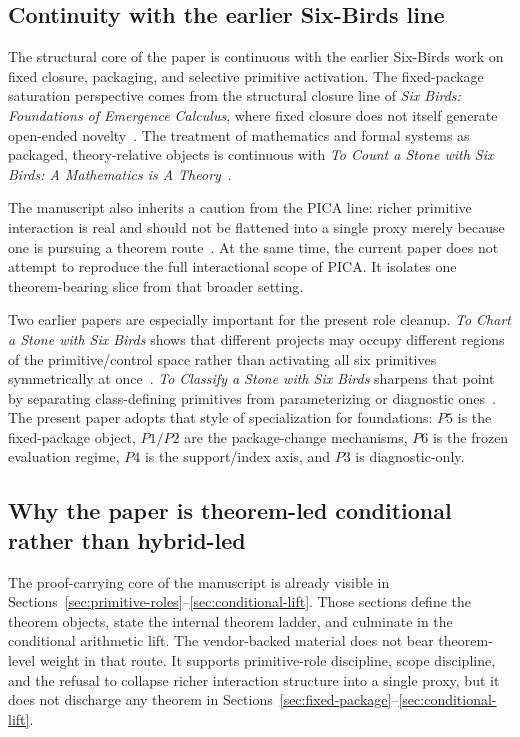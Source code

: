 \documentclass[11pt]{article}
\begin{document}
\subsection*{Continuity with the earlier Six-Birds line}

The structural core of the paper is continuous with the earlier Six-Birds work
on fixed closure, packaging, and selective primitive activation. The
fixed-package saturation perspective comes from the structural closure line of
\emph{Six Birds: Foundations of Emergence Calculus}, where fixed closure does not
itself generate open-ended novelty~\cite{Tsiokos2026Foundations}. The treatment
of mathematics and formal systems as packaged, theory-relative objects is
continuous with \emph{To Count a Stone with Six Birds: A Mathematics is A
Theory}~\cite{Tsiokos2026ToCount}.

The manuscript also inherits a caution from the PICA line: richer primitive
interaction is real and should not be flattened into a single proxy merely
because one is pursuing a theorem route~\cite{Tsiokos2026ToCreate}. At the same
time, the current paper does not attempt to reproduce the full interactional
scope of PICA. It isolates one theorem-bearing slice from that broader setting.

Two earlier papers are especially important for the present role cleanup.
\emph{To Chart a Stone with Six Birds} shows that different projects may occupy
different regions of the primitive/control space rather than activating all six
primitives symmetrically at once~\cite{Tsiokos2026ToChart}. \emph{To Classify a
Stone with Six Birds} sharpens that point by separating class-defining
primitives from parameterizing or diagnostic ones~\cite{Tsiokos2026ToClassify}.
The present paper adopts that style of specialization for foundations: \(P5\) is
the fixed-package object, \(P1/P2\) are the package-change mechanisms, \(P6\) is
the frozen evaluation regime, \(P4\) is the support/index axis, and \(P3\) is
diagnostic-only.

\subsection*{Why the paper is theorem-led conditional rather than hybrid-led}

The proof-carrying core of the manuscript is already visible in
Sections~\ref{sec:primitive-roles}--\ref{sec:conditional-lift}. Those sections
define the theorem objects, state the internal theorem ladder, and culminate in
the conditional arithmetic lift. The vendor-backed material does not bear
theorem-level weight in that route. It supports primitive-role discipline, scope
discipline, and the refusal to collapse richer interaction structure into a
single proxy, but it does not discharge any theorem in
Sections~\ref{sec:fixed-package}--\ref{sec:conditional-lift}.
\end{document}
